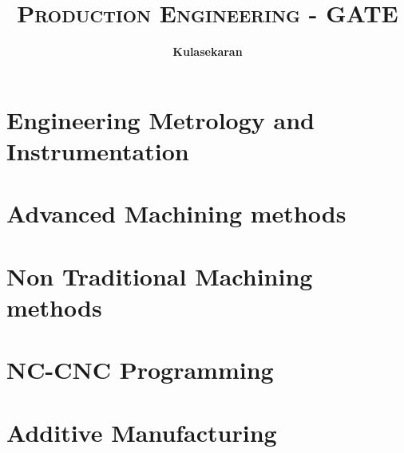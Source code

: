 \documentclass[8pt]{report}
\title{\Huge{\textsc{Production Engineering	 - GATE}}}
\author{\huge{\textbf{Kulasekaran}}}
\begin{document}
\maketitle
\tableofcontents
\chapter{Engineering Metrology and Instrumentation}
\chapter{Advanced Machining methods}
\chapter{Non Traditional Machining methods}
\chapter{NC-CNC Programming}
\chapter{Additive Manufacturing}
\end{document}
